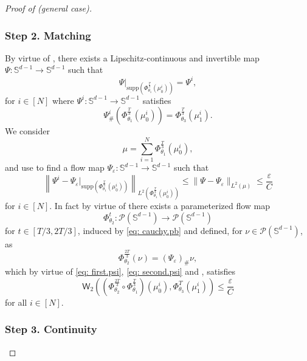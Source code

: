 \documentclass[a4paper,11pt]{article}
\theoremstyle{plain}
\newcommand{\supp}{\mathrm{supp}}
\renewcommand{\S}{\mathbb{S}^{d-1}}
\renewcommand{\leq}{\leqslant}
\numberwithin{equation}{section}
\begin{document}
\begin{proof}[Proof of  (general case)]
\subsubsection*{Step 2. Matching}


By virtue of , there exists a Lipschitz-continuous and invertible map $\Psi:\S\to \S$ such that 
\begin{equation*}
    \Psi\Big|_{\supp\left(\Phi^{\frac{T}{3}}_{\theta_1}(\mu_0^i)\right)}=\Psi^i,
\end{equation*}
for $i\in[N]$ where $\Psi^i:\S\to\S$ satisfies 
\begin{equation} \label{eq: first.psi}
    \Psi^i_\# \left(\Phi^{\frac{T}{3}}_{\theta_1}(\mu_0^i)\right)=\Phi^{\frac{T}{3}}_{\theta_3}(\mu_1^i).
\end{equation}
We consider
\begin{equation*}
    \mu=\sum_{i=1}^N \Phi_{\theta_1}^{\frac{T}{3}}(\mu_0^i),
\end{equation*}
and use  to find a flow map $\Psi_\varepsilon:\S\to\S$ such that
\begin{equation} \label{eq: second.psi}
    \left\|\Psi^i-\Psi_\varepsilon\Big|_{\supp\left(\Phi_{\theta_1}^{\frac{T}{3}}(\mu_0^i)\right)}\right\|_{L^2\left(\Phi_{\theta_1}^{\frac{T}{3}}(\mu_0^i)\right)}\leq\|\Psi-\Psi_\varepsilon\|_{L^2(\mu)}\leq\frac{\varepsilon}{C}
\end{equation}
for $i\in[N]$. In fact by virtue of  there exists a parameterized flow map
\begin{equation*}
    \Phi_{\theta_2}^{t}:\mathscr{P}(\S)\to \mathscr{P}(\S)
\end{equation*}
for $t\in[T/3,2T/3]$, induced by \eqref{eq: cauchy.pb} and defined, for $\nu\in \mathscr{P}(\S)$, as
\begin{equation*}
    \Phi_{\theta_2}^{\frac{2T}{3}}(\nu)=(\Psi_\varepsilon)_\#\nu,
\end{equation*}
which by virtue of \eqref{eq: first.psi}, \eqref{eq: second.psi} and , satisfies
\begin{equation}\label{eq: gluing.flow}
    \mathsf{W}_2\left(\left(\Phi_{\theta_2}^{\frac{2T}{3}}\circ \Phi_{\theta_1}^{\frac{T}{3}}\right)(\mu_0^i),\Phi_{\theta_3}^{T}(\mu_1^i)\right)\leq\frac{\varepsilon}{C}
\end{equation}
for all $i\in[N]$.

\subsubsection*{Step 3. Continuity}


\end{proof}
\end{document}
